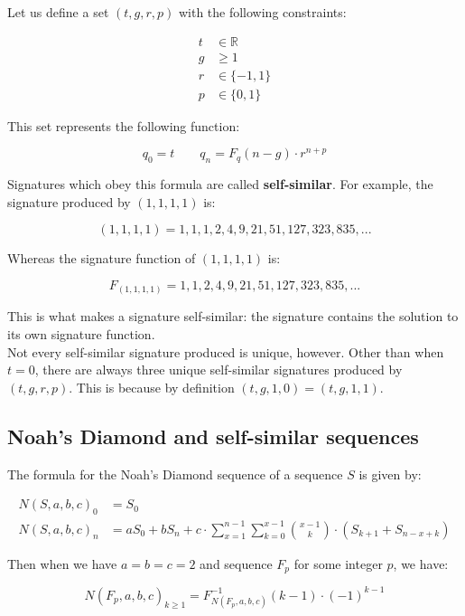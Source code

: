 \documentclass{article}
\begin{document}
Let us define a set $(t, g, r, p)$ with the following constraints:

\begin{align*}
t &\in \mathbb{R}\\
g &\geq 1\\
r &\in \{-1, 1\}\\
p &\in \{0, 1\}
\end{align*}

\noindent This set represents the following function:

$$q_0 = t \qquad q_n = F_q (n - g) \cdot r^{n+p}$$

\noindent Signatures which obey this formula are called \textbf{self-similar}. For example, the signature produced by $(1, 1, 1, 1)$ is:

$$(1, 1, 1, 1) = 1, 1, 1, 2, 4, 9, 21, 51, 127, 323, 835, ...$$

\noindent Whereas the signature function of $(1, 1, 1, 1)$ is:

$$F_{(1, 1, 1, 1)} = 1, 1, 2, 4, 9, 21, 51, 127, 323, 835, ...$$

\noindent This is what makes a signature self-similar: the signature contains the solution to its own signature function.\\

\noindent Not every self-similar signature produced is unique, however. Other than when $t = 0$, there are always three unique self-similar signatures produced by $(t, g, r,  p)$. This is because by definition $(t, g, 1, 0) = (t, g, 1, 1)$.\\


\subsection{Noah's Diamond and self-similar sequences}

The formula for the Noah's Diamond sequence of a sequence $S$ is given by:

\begin{align*}
N(S, a, b, c)_0 &= S_0\\
N(S, a, b, c)_n &= aS_0 + bS_n + c \cdot \sum_{x=1}^{n-1} \sum_{k=0}^{x - 1} \binom{x-1}{k} \cdot \left( S_{k+1} + S_{n-x+k} \right)
\end{align*}

\noindent Then when we have $a=b=c=2$ and sequence $F_p$ for some integer $p$, we have:

$$N(F_p, a, b, c)_{k \geq 1} = F^{-1}_{ N(F_p, a, b, c)} (k-1) \cdot (-1)^{k-1}$$
\end{document}

